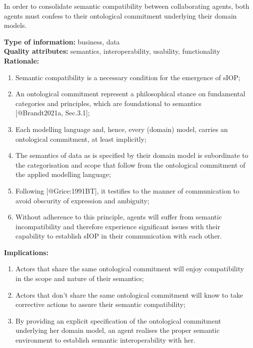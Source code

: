 \documentclass[sort&compress,preprint,authoryear,3p,twocolumn]{elsarticle}
\begin{document}
\begin{mmdp}\label{dp:eoc}

In order to consolidate semantic compatibility between collaborating agents, both agents must confess to their ontological commitment underlying their domain models.

\textbf{Type of information:} business, data  \\
\textbf{Quality attributes:} semantics, interoperability, usability, functionality   \\
\textbf{Rationale:}
\begin{enumerate}
  \item Semantic compatibility is a necessary condition for the emergence of sIOP;
  \item An ontological commitment represent a philosophical stance on fundamental categories and principles, which are foundational to semantics [@Brandt2021a, Sec.3.1];
  \item Each modelling language and, hence, every (domain) model, carries an ontological commitment, at least implicitly;
  \item The semantics of data as is specified by their domain model is subordinate to the categorisation and scope that follow from the ontological commitment of the applied modelling language; 
  \item Following [@Grice:1991BT], it testifies to the manner of communication to avoid obscurity of expression and ambiguity; 
  \item Without adherence to this principle, agents will suffer from semantic incompatibility and therefore experience significant issues with their capability to establish sIOP in their communication with each other.
\end{enumerate}
\textbf{Implications:}
\begin{enumerate}
  \item Actors that share the same ontological commitment will enjoy compatibility in the scope and nature of their semantics;
  \item Actors that don’t share the same ontological commitment will know to take corrective actions to assure their semantic compatibility;
  \item By providing an explicit specification of the ontological commitment underlying her domain model, an agent realises the proper semantic environment to establish semantic interoperability with her.
\end{enumerate}  
\end{mmdp}
\end{document}
